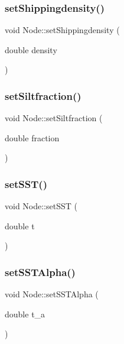 \subsubsection{\texorpdfstring{setShippingdensity()}{setShippingdensity()}}
{\footnotesize\ttfamily void Node\+::set\+Shippingdensity (\begin{DoxyParamCaption}\item[{double}]{density }\end{DoxyParamCaption})\hspace{0.3cm}{\ttfamily [inline]}}

\mbox{\label{class_node_ae693339b788bd83cef068425e69338d9}} 
\subsubsection{\texorpdfstring{setSiltfraction()}{setSiltfraction()}}
{\footnotesize\ttfamily void Node\+::set\+Siltfraction (\begin{DoxyParamCaption}\item[{double}]{fraction }\end{DoxyParamCaption})\hspace{0.3cm}{\ttfamily [inline]}}

\mbox{\label{class_node_a6f1c6c34045788af947b11efd4a0b1fc}} 
\subsubsection{\texorpdfstring{setSST()}{setSST()}}
{\footnotesize\ttfamily void Node\+::set\+S\+ST (\begin{DoxyParamCaption}\item[{double}]{t }\end{DoxyParamCaption})\hspace{0.3cm}{\ttfamily [inline]}}

\mbox{\label{class_node_a1f2b09908b727d059ddf20e47a0ac72d}} 
\subsubsection{\texorpdfstring{setSSTAlpha()}{setSSTAlpha()}}
{\footnotesize\ttfamily void Node\+::set\+S\+S\+T\+Alpha (\begin{DoxyParamCaption}\item[{double}]{t\+\_\+a }\end{DoxyParamCaption})\hspace{0.3cm}{\ttfamily [inline]}}


